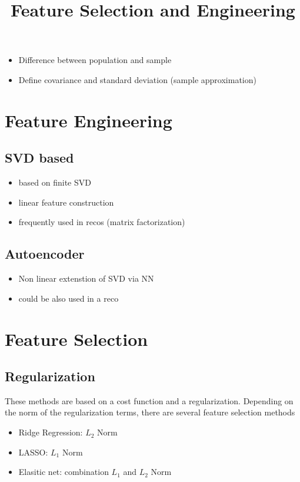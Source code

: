 \documentclass[10pt,a4paper]{article}
\title{Feature Selection and Engineering}
\begin{document}
\maketitle

\begin{itemize}
\item Difference between population and sample
\item Define covariance and standard deviation (sample approximation)
\end{itemize}

\section{Feature Engineering}
\subsection*{SVD based}
\begin{itemize}
\item based on finite SVD
\item linear feature construction
\item frequently used in recos (matrix factorization) 
\end{itemize}

\subsection*{Autoencoder}
\begin{itemize}
\item Non linear extenstion of SVD via NN
\item could be also used in a reco
\end{itemize}

\section{Feature Selection}

\subsection*{Regularization}
These methods are based on a cost function and a regularization. Depending on the norm of the regularization terms, there are several feature selection methods
\begin{itemize}
\item Ridge Regression: $L_2$ Norm
\item LASSO: $L_1$ Norm
\item Elasitic net: combination $L_1$ and $L_2$ Norm
\end{itemize}
\end{document}
